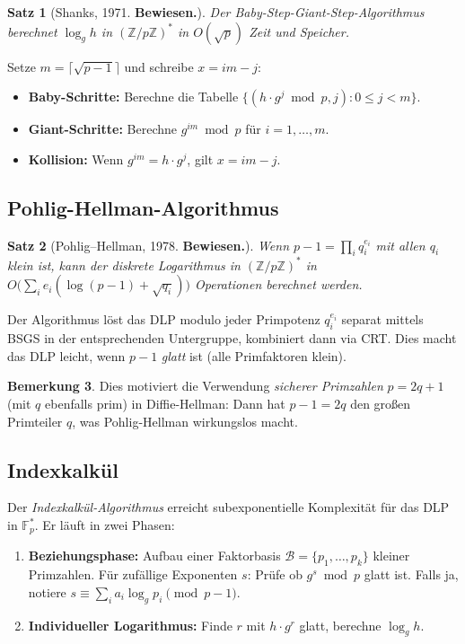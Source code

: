 \documentclass[12pt,a4paper]{amsart}
\newtheorem{theorem}{Satz}[section]
\theoremstyle{definition}
\newtheorem{bemerkung}[theorem]{Bemerkung}
\begin{document}
\begin{theorem}[Shanks, 1971. \textbf{Bewiesen.}]
Der Baby-Step-Giant-Step-Algorithmus berechnet $\log_g h$ in
$(\mathbb{Z}/p\mathbb{Z})^*$ in $O(\sqrt{p})$ Zeit und Speicher.
\end{theorem}

Setze $m = \lceil\sqrt{p-1}\rceil$ und schreibe $x = im - j$:
\begin{itemize}
  \item \textbf{Baby-Schritte:} Berechne die Tabelle
    $\{(h \cdot g^j \bmod p, j) : 0 \le j < m\}$.
  \item \textbf{Giant-Schritte:} Berechne $g^{im} \bmod p$ für $i = 1,\ldots,m$.
  \item \textbf{Kollision:} Wenn $g^{im} = h \cdot g^j$, gilt $x = im - j$.
\end{itemize}

\subsection{Pohlig-Hellman-Algorithmus}

\begin{theorem}[Pohlig--Hellman, 1978. \textbf{Bewiesen.}]
Wenn $p-1 = \prod_i q_i^{e_i}$ mit allen $q_i$ klein ist, kann der diskrete
Logarithmus in $(\mathbb{Z}/p\mathbb{Z})^*$ in
$O\bigl(\sum_i e_i(\log(p-1) + \sqrt{q_i})\bigr)$ Operationen berechnet werden.
\end{theorem}

Der Algorithmus löst das DLP modulo jeder Primpotenz $q_i^{e_i}$ separat mittels
BSGS in der entsprechenden Untergruppe, kombiniert dann via CRT. Dies macht das
DLP leicht, wenn $p-1$ \emph{glatt} ist (alle Primfaktoren klein).

\begin{bemerkung}
Dies motiviert die Verwendung \emph{sicherer Primzahlen} $p = 2q+1$ (mit $q$
ebenfalls prim) in Diffie-Hellman: Dann hat $p-1 = 2q$ den großen Primteiler $q$,
was Pohlig-Hellman wirkungslos macht.
\end{bemerkung}

\subsection{Indexkalkül}

Der \emph{Indexkalkül-Algorithmus} erreicht subexponentielle Komplexität für
das DLP in $\mathbb{F}_p^*$. Er läuft in zwei Phasen:

\begin{enumerate}[label=\arabic*.]
  \item \textbf{Beziehungsphase:} Aufbau einer Faktorbasis
    $\mathcal{B} = \{p_1,\ldots,p_k\}$ kleiner Primzahlen. Für zufällige
    Exponenten $s$: Prüfe ob $g^s \bmod p$ glatt ist. Falls ja, notiere
    $s \equiv \sum_i a_i \log_g p_i \pmod{p-1}$.
  \item \textbf{Individueller Logarithmus:} Finde $r$ mit $h \cdot g^r$ glatt,
    berechne $\log_g h$.
\end{enumerate}
\end{document}
